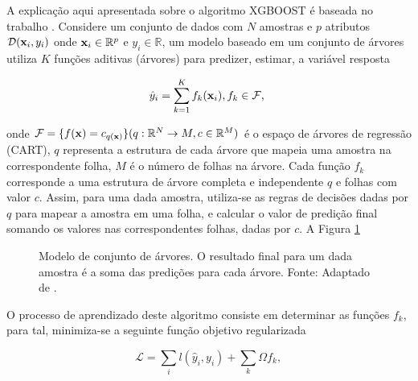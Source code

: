 A explicação aqui apresentada sobre o algoritmo XGBOOST é baseada no trabalho \cite{CHEN:2016}. Considere um conjunto de dados com $N$ amostras e $p$ atributos $\mathcal{D}({\bf x}_i, y_i)$ onde ${\bf x}_i\in\mathbb{R}^p$ e $y_i\in\mathbb{R}$, um modelo baseado em um conjunto de árvores utiliza $K$ funções aditivas (árvores) para predizer, estimar, a variável resposta

\begin{equation}\label{eq:xgboost}
\hat{y}_i=\sum_{k=1}^{K}f_{k}({\bf x}_i)\mbox{,}\,f_{k}\in\mathcal{F}\mbox{,}~
\end{equation}

onde $\mathcal{F}=\{f({\bf x})=c_{q({\bf x})}\}(q:\mathbb{R}^N\to{M},c\in\mathbb{R}^{M})$ é o espaço de árvores de regressão (CART), $q$ representa a estrutura de cada árvore que mapeia uma amostra na correspondente folha, $M$ é o número de folhas na árvore. Cada função $f_k$ corresponde a uma estrutura de árvore completa e independente $q$ e folhas com valor $c$. Assim, para uma dada amostra, utiliza-se as regras de decisões dadas por $q$ para mapear a amostra em uma folha, e calcular o valor de predição final somando os valores nas correspondentes folhas, dadas por $c$. A Figura \ref{fig:tree_model}

\begin{figure}[H]
\centering
{}
\caption{Modelo de conjunto de árvores. O resultado final para um dada amostra é a soma das predições para cada árvore. Fonte: Adaptado de \cite{CHEN:2016}.}
\label{fig:tree_model}
\end{figure}

O processo de aprendizado deste algoritmo consiste em determinar as funções $f_k$, para tal, minimiza-se a seguinte função objetivo regularizada

\begin{equation}\label{eq:xgboostmin}
\mathcal{L}=\sum_{i}l(\hat{y}_i, y_i)+\sum_{k}\Omega{f_k}\mbox{,}~
\end{equation}

